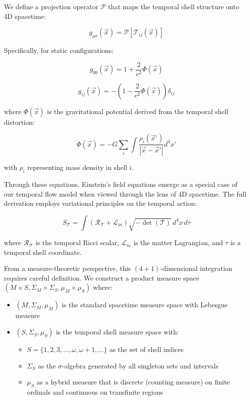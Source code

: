 \documentclass[12pt,a4paper]{article}
\begin{document}
We define a projection operator $\mathcal{P}$ that maps the temporal shell structure onto 4D spacetime:

\begin{equation}
g_{\mu\nu}(\vec{x}) = \mathcal{P}\left[\mathcal{T}_{ij}(\vec{x})\right]
\end{equation}

Specifically, for static configurations:

\begin{equation}
g_{00}(\vec{x}) = 1 + \frac{2}{c^2} \Phi(\vec{x})
\end{equation}

\begin{equation}
g_{ij}(\vec{x}) = -\left(1 - \frac{2}{c^2} \Phi(\vec{x})\right) \delta_{ij}
\end{equation}

where $\Phi(\vec{x})$ is the gravitational potential derived from the temporal shell distortion:

\begin{equation}
\Phi(\vec{x}) = -G \sum_i \int \frac{\rho_i(\vec{x}')}{|\vec{x} - \vec{x}'|} d^3x'
\end{equation}

with $\rho_i$ representing mass density in shell $i$.

Through these equations, Einstein's field equations emerge as a special case of our temporal flow model when viewed through the lens of 4D spacetime. The full derivation employs variational principles on the temporal action:

\begin{equation}
S_{\mathcal{T}} = \int \left(\mathcal{R}_{\mathcal{T}} + \mathcal{L}_m \right) \sqrt{-\det(\mathcal{T})} \, d^4x \, d\tau
\end{equation}

where $\mathcal{R}_{\mathcal{T}}$ is the temporal Ricci scalar, $\mathcal{L}_m$ is the matter Lagrangian, and $\tau$ is a temporal shell coordinate.

From a measure-theoretic perspective, this $(4+1)$-dimensional integration requires careful definition. We construct a product measure space $(M \times S, \Sigma_M \times \Sigma_S, \mu_M \times \mu_S)$ where:
\begin{itemize}
    \item $(M, \Sigma_M, \mu_M)$ is the standard spacetime measure space with Lebesgue measure
    \item $(S, \Sigma_S, \mu_S)$ is the temporal shell measure space with:
    \begin{itemize}
        \item $S = \{1, 2, 3, \ldots, \omega, \omega+1, \ldots\}$ as the set of shell indices
        \item $\Sigma_S$ as the $\sigma$-algebra generated by all singleton sets and intervals
        \item $\mu_S$ as a hybrid measure that is discrete (counting measure) on finite ordinals and continuous on transfinite regions
    \end{itemize}
\end{itemize}
\end{document}
